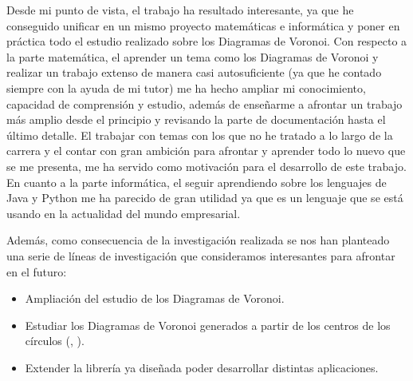 Desde mi punto de vista, el trabajo ha resultado interesante, ya que he conseguido unificar en un mismo proyecto matemáticas e informática y poner en práctica todo el estudio realizado sobre los Diagramas de Voronoi.
Con respecto a la parte matemática, el aprender un tema como los Diagramas de Voronoi y realizar un trabajo extenso de manera casi autosuficiente (ya que he contado siempre con la ayuda de mi tutor) me ha hecho ampliar mi conocimiento, capacidad de comprensión y estudio, además de enseñarme a afrontar un trabajo más amplio desde el principio y revisando la parte de documentación hasta el último detalle. El trabajar con temas con los que no he tratado a lo largo de la carrera y el contar con gran ambición para afrontar y aprender todo lo nuevo que se me presenta, me ha servido como motivación para el desarrollo de este trabajo.
En cuanto a la parte informática, el seguir aprendiendo sobre los lenguajes de Java y Python me ha parecido de gran utilidad ya que es un lenguaje que se está usando en la actualidad del mundo empresarial.
\vspace{0.3cm}

Además, como consecuencia de la investigación realizada se nos han planteado una serie de líneas de investigación que consideramos interesantes para afrontar en el futuro: 

\begin{itemize}
    \item Ampliación del estudio de los Diagramas de Voronoi.
    \item Estudiar los Diagramas de Voronoi generados a partir de los centros de los círculos (\cite{circulos}, \cite{gardenfor}).
    \item Extender la librería ya diseñada poder desarrollar distintas aplicaciones.
\end{itemize}